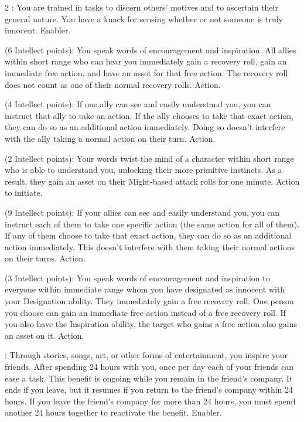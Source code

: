 \begin{multicols}{2}
: You are trained in tasks to discern others’ motives and to ascertain their general nature. You have a knack for sensing whether or not someone is truly innocent. Enabler. 
 
 (6 Intellect points): You speak words of encouragement and inspiration. All allies within short range who can hear you immediately gain a recovery roll, gain an immediate free action, and have an asset for that free action. The recovery roll does not count as one of their normal recovery rolls. Action. 
 
 (4 Intellect points): If one ally can see and easily understand you, you can instruct that ally to take an action. If the ally chooses to take that exact action, they can do so as an additional action immediately. Doing so doesn’t interfere with the ally taking a normal action on their turn. Action. 
 
 (2 Intellect points): Your words twist the mind of a character within short range who is able to understand you, unlocking their more primitive instincts. As a result, they gain an asset on their Might-based attack rolls for one minute. Action to initiate. 
 
 (9 Intellect points): If your allies can see and easily understand you, you can instruct each of them to take one specific action (the same action for all of them). If any of them choose to take that exact action, they can do so as an additional action immediately. This doesn’t interfere with them taking their normal actions on their turns. Action. 
 
 (3 Intellect points): You speak words of encouragement and inspiration to everyone within immediate range whom you have designated as innocent with your Designation ability. They immediately gain a free recovery roll. One person you choose can gain an immediate free action instead of a free recovery roll. If you also have the Inspiration ability, the target who gains a free action also gains an asset on it. Action. 
 
: Through stories, songs, art, or other forms of entertainment, you inspire your friends. After spending 24 hours with you, once per day each of your friends can ease a task. This benefit is ongoing while you remain in the friend’s company. It ends if you leave, but it resumes if you return to the friend’s company within 24 hours. If you leave the friend’s company for more than 24 hours, you must spend another 24 hours together to reactivate the benefit. Enabler. 
 

\end{multicols}
